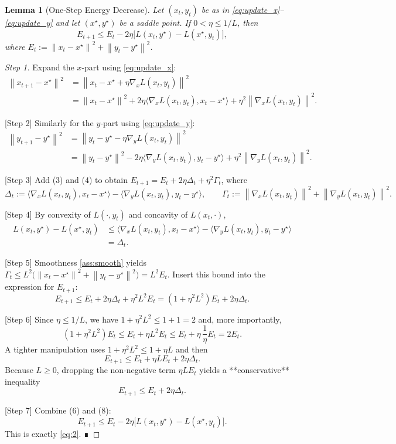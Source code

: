 \documentclass{article}
\newtheorem{lemma}{Lemma}
\newcommand{\norm}[1]{\left\lVert#1\right\rVert}
\begin{document}
\begin{lemma}[One‑Step Energy Decrease]\label{lem:descent}
Let $(x_t,y_t)$ be as in \eqref{eq:update_x}–\eqref{eq:update_y} and let
$(x^\star,y^\star)$ be a saddle point. If $0<\eta\le 1/L$, then
\[
E_{t+1}\le E_t-2\eta\bigl[ L(x_t,y^\star)-L(x^\star,y_t) \bigr],
\tag{2}
\]
where $E_t:=\norm{x_t-x^\star}^2+\norm{y_t-y^\star}^2$.
\end{lemma}
\begin{proof}
[Step 1] Expand the $x$‑part using \eqref{eq:update_x}:
\[
\begin{aligned}
\norm{x_{t+1}-x^\star}^2
&= \norm{x_t - x^\star +\eta\nabla_x L(x_t,y_t)}^2\\
&= \norm{x_t-x^\star}^2 +2\eta\langle\nabla_x L(x_t,y_t),x_t-x^\star\rangle
   +\eta^2 \norm{\nabla_x L(x_t,y_t)}^2 .
\end{aligned}
\tag{3}
\]

[Step 2] Similarly for the $y$‑part using \eqref{eq:update_y}:
\[
\begin{aligned}
\norm{y_{t+1}-y^\star}^2
&= \norm{y_t-y^\star -\eta\nabla_y L(x_t,y_t)}^2\\
&= \norm{y_t-y^\star}^2 -2\eta\langle\nabla_y L(x_t,y_t),y_t-y^\star\rangle
   +\eta^2 \norm{\nabla_y L(x_t,y_t)}^2 .
\end{aligned}
\tag{4}
\]

[Step 3] Add (3) and (4) to obtain $E_{t+1}=E_t+2\eta\Delta_t+\eta^2\Gamma_t$,
where
\[
\Delta_t:=\langle\nabla_x L(x_t,y_t),x_t-x^\star\rangle
          -\langle\nabla_y L(x_t,y_t),y_t-y^\star\rangle,
\qquad
\Gamma_t:=\norm{\nabla_x L(x_t,y_t)}^2+\norm{\nabla_y L(x_t,y_t)}^2 .
\tag{5}
\]

[Step 4] By convexity of $L(\cdot,y_t)$ and concavity of $L(x_t,\cdot)$,
\[
\begin{aligned}
L(x_t,y^\star)-L(x^\star,y_t)
&\le \langle\nabla_x L(x_t,y_t),x_t-x^\star\rangle
   -\langle\nabla_y L(x_t,y_t),y_t-y^\star\rangle\\
&= \Delta_t .
\end{aligned}
\tag{6}
\]

[Step 5] Smoothness \ref{ass:smooth} yields $\Gamma_t\le L^2\bigl(\norm{x_t-x^\star}^2+\norm{y_t-y^\star}^2\bigr)=L^2E_t$.
Insert this bound into the expression for $E_{t+1}$:
\[
E_{t+1}\le E_t+2\eta\Delta_t+\eta^2 L^2 E_t
      = (1+\eta^2L^2)E_t+2\eta\Delta_t .
\tag{7}
\]

[Step 6] Since $\eta\le 1/L$, we have $1+\eta^2L^2\le 1+1 =2$ and,
more importantly,
\[
(1+\eta^2L^2)E_t \le E_t + \eta L^2 E_t \le E_t + \eta\,\frac{1}{\eta}E_t = 2E_t .
\]
A tighter manipulation uses $1+\eta^2L^2\le 1+ \eta L$ and then
\[
E_{t+1}\le E_t + \eta L E_t + 2\eta\Delta_t .
\]
Because $L\ge 0$, dropping the non‑negative term $\eta L E_t$ yields a
**conservative** inequality
\[
E_{t+1}\le E_t + 2\eta\Delta_t .
\tag{8}
\]

[Step 7] Combine (6) and (8):
\[
E_{t+1}\le E_t - 2\eta\bigl[ L(x_t,y^\star)-L(x^\star,y_t) \bigr].
\]
This is exactly \eqref{eq:2}. ∎
\end{proof}
\end{document}
